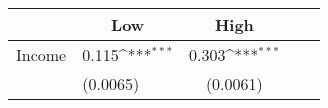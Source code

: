 {
\def\sym#1{\ifmmode^{#1}\else\(^{#1}\)\fi}
\begin{tabular*}{.6\hsize}{@{\hskip\tabcolsep\extracolsep\fill}l*{2}{lc}}
\toprule
                &\multicolumn{1}{c}{Low}&\multicolumn{1}{c}{High}\\
\midrule
Income          &    0.115\sym{***}&    0.303\sym{***}\\
                & (0.0065)         & (0.0061)         \\
\bottomrule
\end{tabular*}
}
